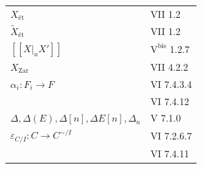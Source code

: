 \begin{longtable}{@{}p{.68\linewidth}p{.27\linewidth}@{}}
$X_{\text{ét}}$ & VII 1.2\\
$\widetilde X_{\text{ét}}$ & VII 1.2\\
$[[X|_uX']]$ & $\mathrm{V}^{\mathrm{bis}}$ 1.2.7\\
$X_{\mathrm{Zar}}$ & VII 4.2.2\\
$\alpha_i:F_i\to F$ & VI 7.4.3.4\\
& VI 7.4.12\\
$\Delta,\Delta(E),\Delta[n],\Delta E[n],\Delta_n$ & V 7.1.0\\
$\varepsilon_{C/I}:C\to C^{\sim/I}$ & VI 7.2.6.7\\
& VI 7.4.11\\
\end{longtable}
\endgroup
